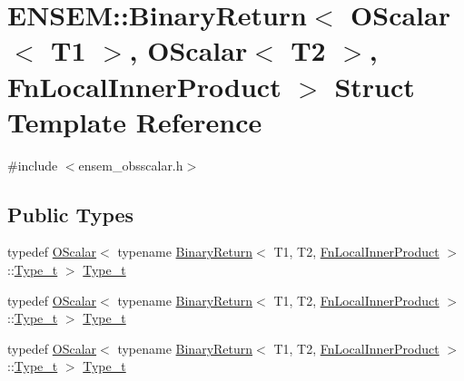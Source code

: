 \hypertarget{structENSEM_1_1BinaryReturn_3_01OScalar_3_01T1_01_4_00_01OScalar_3_01T2_01_4_00_01FnLocalInnerProduct_01_4}{}\section{E\+N\+S\+EM\+:\+:Binary\+Return$<$ O\+Scalar$<$ T1 $>$, O\+Scalar$<$ T2 $>$, Fn\+Local\+Inner\+Product $>$ Struct Template Reference}
\label{structENSEM_1_1BinaryReturn_3_01OScalar_3_01T1_01_4_00_01OScalar_3_01T2_01_4_00_01FnLocalInnerProduct_01_4}


{\ttfamily \#include $<$ensem\+\_\+obsscalar.\+h$>$}

\subsection*{Public Types}
\begin{DoxyCompactItemize}
\item 
typedef \mbox{\hyperlink{classENSEM_1_1OScalar}{O\+Scalar}}$<$ typename \mbox{\hyperlink{structENSEM_1_1BinaryReturn}{Binary\+Return}}$<$ T1, T2, \mbox{\hyperlink{structENSEM_1_1FnLocalInnerProduct}{Fn\+Local\+Inner\+Product}} $>$\+::\mbox{\hyperlink{structENSEM_1_1BinaryReturn_3_01OScalar_3_01T1_01_4_00_01OScalar_3_01T2_01_4_00_01FnLocalInnerProduct_01_4_a96c2eb7ff0bb862f8f194a8170dac35a}{Type\+\_\+t}} $>$ \mbox{\hyperlink{structENSEM_1_1BinaryReturn_3_01OScalar_3_01T1_01_4_00_01OScalar_3_01T2_01_4_00_01FnLocalInnerProduct_01_4_a96c2eb7ff0bb862f8f194a8170dac35a}{Type\+\_\+t}}
\item 
typedef \mbox{\hyperlink{classENSEM_1_1OScalar}{O\+Scalar}}$<$ typename \mbox{\hyperlink{structENSEM_1_1BinaryReturn}{Binary\+Return}}$<$ T1, T2, \mbox{\hyperlink{structENSEM_1_1FnLocalInnerProduct}{Fn\+Local\+Inner\+Product}} $>$\+::\mbox{\hyperlink{structENSEM_1_1BinaryReturn_3_01OScalar_3_01T1_01_4_00_01OScalar_3_01T2_01_4_00_01FnLocalInnerProduct_01_4_a96c2eb7ff0bb862f8f194a8170dac35a}{Type\+\_\+t}} $>$ \mbox{\hyperlink{structENSEM_1_1BinaryReturn_3_01OScalar_3_01T1_01_4_00_01OScalar_3_01T2_01_4_00_01FnLocalInnerProduct_01_4_a96c2eb7ff0bb862f8f194a8170dac35a}{Type\+\_\+t}}
\item 
typedef \mbox{\hyperlink{classENSEM_1_1OScalar}{O\+Scalar}}$<$ typename \mbox{\hyperlink{structENSEM_1_1BinaryReturn}{Binary\+Return}}$<$ T1, T2, \mbox{\hyperlink{structENSEM_1_1FnLocalInnerProduct}{Fn\+Local\+Inner\+Product}} $>$\+::\mbox{\hyperlink{structENSEM_1_1BinaryReturn_3_01OScalar_3_01T1_01_4_00_01OScalar_3_01T2_01_4_00_01FnLocalInnerProduct_01_4_a96c2eb7ff0bb862f8f194a8170dac35a}{Type\+\_\+t}} $>$ \mbox{\hyperlink{structENSEM_1_1BinaryReturn_3_01OScalar_3_01T1_01_4_00_01OScalar_3_01T2_01_4_00_01FnLocalInnerProduct_01_4_a96c2eb7ff0bb862f8f194a8170dac35a}{Type\+\_\+t}}
\end{DoxyCompactItemize}


